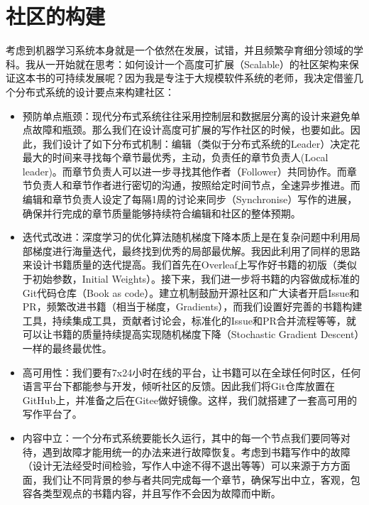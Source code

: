 \documentclass[letterpaper,10pt,english]{sphinxmanual}
\begin{document}
\section{社区的构建}
\label{\detokenize{chapter_preface/index:id4}}
\sphinxAtStartPar
考虑到机器学习系统本身就是一个依然在发展，试错，并且频繁孕育细分领域的学科。我从一开始就在思考：如何设计一个高度可扩展（Scalable）的社区架构来保证这本书的可持续发展呢？因为我是专注于大规模软件系统的老师，我决定借鉴几个分布式系统的设计要点来构建社区：
\begin{itemize}
\item {} 
\sphinxAtStartPar
预防单点瓶颈：现代分布式系统往往采用控制层和数据层分离的设计来避免单点故障和瓶颈。那么我们在设计高度可扩展的写作社区的时候，也要如此。因此，我们设计了如下分布式机制：编辑（类似于分布式系统的Leader）决定花最大的时间来寻找每个章节最优秀，主动，负责任的章节负责人(Local
leader)。而章节负责人可以进一步寻找其他作者（Follower）共同协作。而章节负责人和章节作者进行密切的沟通，按照给定时间节点，全速异步推进。而编辑和章节负责人设定了每隔1周的讨论来同步（Synchronise）写作的进展，确保并行完成的章节质量能够持续符合编辑和社区的整体预期。

\item {} 
\sphinxAtStartPar
迭代式改进：深度学习的优化算法随机梯度下降本质上是在复杂问题中利用局部梯度进行海量迭代，最终找到优秀的局部最优解。我因此利用了同样的思路来设计书籍质量的迭代提高。我们首先在Overleaf上写作好书籍的初版（类似于初始参数，Initial
Weights）。接下来，我们进一步将书籍的内容做成标准的Git代码仓库（Book
as
code）。建立机制鼓励开源社区和广大读者开启Issue和PR，频繁改进书籍（相当于梯度，Gradients），而我们设置好完善的书籍构建工具，持续集成工具，贡献者讨论会，标准化的Issue和PR合并流程等等，就可以让书籍的质量持续提高实现随机梯度下降（Stochastic
Gradient Descent）一样的最终最优性。

\item {} 
\sphinxAtStartPar
高可用性：我们要有7x24小时在线的平台，让书籍可以在全球任何时区，任何语言平台下都能参与开发，倾听社区的反馈。因此我们将Git仓库放置在GitHub上，并准备之后在Gitee做好镜像。这样，我们就搭建了一套高可用的写作平台了。

\item {} 
\sphinxAtStartPar
内容中立：一个分布式系统要能长久运行，其中的每一个节点我们要同等对待，遇到故障才能用统一的办法来进行故障恢复。考虑到书籍写作中的故障（设计无法经受时间检验，写作人中途不得不退出等等）可以来源于方方面面，我们让不同背景的参与者共同完成每一个章节，确保写出中立，客观，包容各类型观点的书籍内容，并且写作不会因为故障而中断。

\end{itemize}
\end{document}
